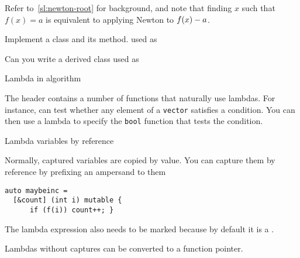 \begin{exercise}
  \label{ex:newtonlambda}
  Refer to~\ref{sl:newton-root} for background, and note that finding
  $x$ such that $f(x)=a$ is equivalent to applying Newton to
  $f(x)-\nobreak a$.

  Implement a class  and its  method.
  used as
\end{exercise}

\begin{exercise}
  \label{ex:morenewtonlambda}
  Can you write a derived class  used as
\end{exercise}

 {Lambda in algorithm}

The  header contains a number of functions that
naturally use lambdas. For instance,  can test
whether any element of a \lstinline{vector} satisfies a condition.
You can then use a lambda to specify the \lstinline{bool} function
that tests the condition.

 {Lambda variables by reference}

Normally, captured variables are copied by value. You can capture them
by reference by prefixing an ampersand to them
\begin{lstlisting}
auto maybeinc =
  [&count] (int i) mutable {
      if (f(i)) count++; }
\end{lstlisting}
The lambda expression also needs to be marked
because by default it is a
.


Lambdas without captures can be converted to a function pointer.

